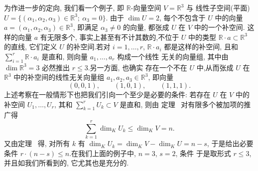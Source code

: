 为作进一步的定向, 我们看一个例子, 即 $\mathbb{R}$-向量空间 $V = \mathbb{R}^3$ 与
线性子空间(平面)$U = \{ (\alpha_1, \alpha_2, \alpha_3) \in \mathbb{R}^3 ;\ \alpha_3 = 0 \}$.
由于 $\dim U = 2$, 每个不包含于 $U$ 中的向量 $a = (\alpha_1, \alpha_2, \alpha_3) \in
\mathbb{R}^3$, 即满足 $\alpha_3 \neq 0$ 的向量, 都张成 $U$ 在 $V$ 中的一个补空间.
这样的向量 $a$ 有无限多个, 事实上甚至有不计其数的,不位于 $U$ 中的类型
$\mathbb{R} \cdot a \subset \mathbb{R}^3$ 的直线, 它们定义 $U$ 的补空间.若对
$i = 1, \ldots, r$, $\mathbb{R} \cdot a_i$ 都是这样的补空间, 且和
$\sum_{i=1}^{r} \mathbb{R} \cdot a_i$ 是直和, 则向量 $a_1, \ldots, a_r$ 构成一个线性
无关的向量组, 其中由 $\dim \mathbb{R}^3 = 3$ 必然推出 $r \leq 3$.另一方面, 也确实
存在一个不在 $U$ 中,从而张成 $U$ 在 $\mathbb{R}^3$ 中的补空间的线性无关向量组
$a_1, a_2, a_3 \in \mathbb{R}^3$, 即向量
\[
(0, 0, 1), \qquad (1, 0, 1), \qquad (1, 1, 1)\text{.}
\]
上述考察在一般情形下也把我们引向一个至少是必要的条件: 若存在 $U$ 在 $V$ 中的补空间
$U_1, \ldots, U_r$, 其和 $\sum_{k=1}^{r} U_k \subset V$ 是直和, 则由
定理~ 对有限多个被加项的推广得
\[
\sum_{k=1}^{r} \dim_K U_k \leq \dim_K V = n\text{.}
\]
又由定理~ 得, 对所有 $k$ 有 $\dim_K U_k = \dim_K V - \dim_K U = n - s$,
于是给出必要条件 $r \cdot (n - s) \leq n$.在我们上面的例子中, $n = 3$, $s = 2$, 条件
于是取形式 $r \leq 3$, 并且如我们所看到的, 它尤其也是充分的.

